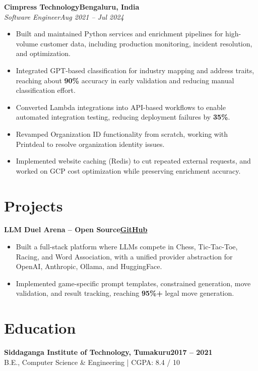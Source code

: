 \documentclass[10pt]{article}
\newcommand{\role}[4]{\textbf{#1}\hfill\textbf{#2}\\ \textit{#3}\hfill\textit{#4}\par\vspace{1pt}}
\begin{document}
\role{Cimpress Technology}{Bengaluru, India}{Software Engineer}{Aug 2021 -- Jul 2024}
\begin{itemize}
\item Built and maintained Python services and enrichment pipelines for high-volume customer data, including production monitoring, incident resolution, and optimization.
\item Integrated GPT-based classification for industry mapping and address traits, reaching about \textbf{90\%} accuracy in early validation and reducing manual classification effort.
\item Converted Lambda integrations into API-based workflows to enable automated integration testing, reducing deployment failures by \textbf{35\%}.
\item Revamped Organization ID functionality from scratch, working with Printdeal to resolve organization identity issues.
\item Implemented website caching (Redis) to cut repeated external requests, and worked on GCP cost optimization while preserving enrichment accuracy.
\end{itemize}

\section*{Projects}
\role{LLM Duel Arena -- Open Source}{\href{https://github.com/singhdotabhinav/llm-duel-arena}{GitHub}}{}{}
\begin{itemize}
\item Built a full-stack platform where LLMs compete in Chess, Tic-Tac-Toe, Racing, and Word Association, with a unified provider abstraction for OpenAI, Anthropic, Ollama, and HuggingFace.
\item Implemented game-specific prompt templates, constrained generation, move validation, and result tracking, reaching \textbf{95\%+} legal move generation.
\end{itemize}

\section*{Education}
\textbf{Siddaganga Institute of Technology, Tumakuru}\hfill\textbf{2017 -- 2021}\\
B.E., Computer Science \& Engineering | CGPA: 8.4 / 10
\end{document}
